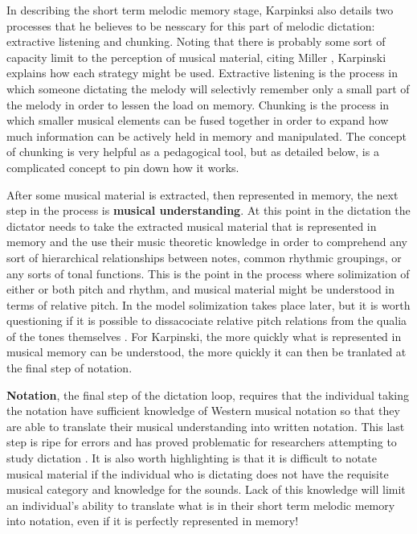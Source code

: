 \documentclass[]{book}
\theoremstyle{definition}
\theoremstyle{definition}
\theoremstyle{definition}
\theoremstyle{remark}
\begin{document}
In describing the short term melodic memory stage, Karpinksi also
details two processes that he believes to be nesscary for this part of
melodic dictation: extractive listening and chunking. Noting that there
is probably some sort of capacity limit to the perception of musical
material, citing Miller \citeyearpar{millerMagicalNumberSeven1956},
Karpinski explains how each strategy might be used. Extractive listening
is the process in which someone dictating the melody will selectivly
remember only a small part of the melody in order to lessen the load on
memory. Chunking is the process in which smaller musical elements can be
fused together in order to expand how much information can be actively
held in memory and manipulated. The concept of chunking is very helpful
as a pedagogical tool, but as detailed below, is a complicated concept
to pin down how it works.

After some musical material is extracted, then represented in memory,
the next step in the process is \textbf{musical understanding}. At this
point in the dictation the dictator needs to take the extracted musical
material that is represented in memory and the use their music theoretic
knowledge in order to comprehend any sort of hierarchical relationships
between notes, common rhythmic groupings, or any sorts of tonal
functions. This is the point in the process where solimization of either
or both pitch and rhythm, and musical material might be understood in
terms of relative pitch. In the model solimization takes place later,
but it is worth questioning if it is possible to dissacociate relative
pitch relations from the qualia of the tones themselves
\citep{arthurPerceptualStudyScaledegree2018}. For Karpinski, the more
quickly what is represented in musical memory can be understood, the
more quickly it can then be tranlated at the final step of notation.

\textbf{Notation}, the final step of the dictation loop, requires that
the individual taking the notation have sufficient knowledge of Western
musical notation so that they are able to translate their musical
understanding into written notation. This last step is ripe for errors
and has proved problematic for researchers attempting to study dictation
\citep{taylorStrategiesMemoryShort1983, klonoskiImprovingDictationAuralSkills2006}.
It is also worth highlighting is that it is difficult to notate musical
material if the individual who is dictating does not have the requisite
musical category and knowledge for the sounds. Lack of this knowledge
will limit an individual's ability to translate what is in their short
term melodic memory into notation, even if it is perfectly represented
in memory!
\end{document}
